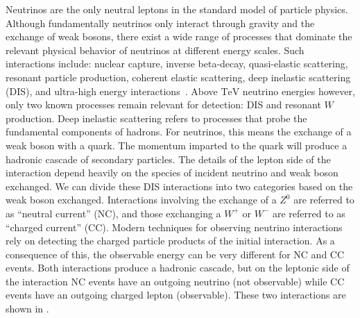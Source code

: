Neutrinos are the only neutral leptons in the standard model of particle physics.
Although fundamentally neutrinos only interact through gravity and the exchange of weak bosons, there exist a wide range of processes that dominate the relevant physical behavior of neutrinos at different energy scales.
Such interactions include: nuclear capture, inverse beta-decay, quasi-elastic scattering, resonant particle production, coherent elastic scattering, deep inelastic scattering (DIS), and ultra-high energy interactions~\cite{Vannucci:2017rqs,Akimov:2017ade}.
Above $\si\TeV$ neutrino energies however, only two known processes remain relevant for detection: DIS and resonant $W$ production.
Deep inelastic scattering refers to processes that probe the fundamental components of hadrons.
For neutrinos, this means the exchange of a weak boson with a quark.
The momentum imparted to the quark will produce a hadronic cascade of secondary particles.
The details of the lepton side of the interaction depend heavily on the species of incident neutrino and weak boson exchanged.
We can divide these DIS interactions into two categories based on the weak boson exchanged.
Interactions involving the exchange of a $Z^0$ are referred to as ``neutral current'' (NC), and those exchanging a $W^+$ or $W^-$ are referred to as ``charged current'' (CC).
Modern techniques for observing neutrino interactions rely on detecting the charged particle products of the initial interaction.
As a consequence of this, the observable energy can be very different for NC and CC events.
Both interactions produce a hadronic cascade, but on the leptonic side of the interaction NC events have an outgoing neutrino (not observable) while CC events have an outgoing charged lepton (observable).
These two interactions are shown in .

